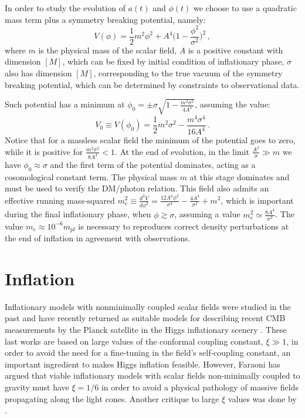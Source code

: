 \documentclass[preprintnumbers,amsmath,amssymb,nofootinbib]{revtex4}
\begin{document}
In order to study the evolution of $a(t)$ and $\phi(t)$ we choose to use a quadratic mass term plus a symmetry breaking potential, namely:
\begin{equation}
V(\phi)=\frac{1}{2}m^2\phi^2 + A^4\Bigg(1-\frac{\phi^2}{\sigma^2}\Bigg)^2 \,,\label{V}
\end{equation}
where $m$ is the physical mass of the scalar field, $A$ is a positive constant with dimension $[M]$, which can be fixed by initial condition of inflationary phase, $\sigma$ also has dimension $[M]$, corresponding to the true vacuum of the symmetry breaking potential, which can be determined by constraints to observational data.

Such potential has a minimum at $\phi_0 = \pm \sigma\sqrt{1-\frac{m^2\sigma^2}{4A^4}}$, assuming the value:
\begin{equation}
    V_0 \equiv V(\phi_0)=\frac{1}{2}m^2\sigma^2 - \frac{m^4 \sigma^4}{16 A^4}\,. \label{V0}
\end{equation}
Notice that for a massless scalar field the minimum of the potential goes to zero, while it is positive for $\frac{m^2\sigma^2}{8A^4}<1$. At the end of evolution, in the limit $\frac{A^2}{\sigma}\gg m$ we have $\phi_0\approx \sigma$ and the first term of the potential dominates, acting as a cosomological constant term. The physical mass $m$ at this stage dominates and must be used to verify the DM/photon relation. This field also admits an effective running mass-squared $m_e^2 \equiv \frac{d^2V}{d\phi^2} = \frac{12A^4\phi^2}{\sigma^4}-\frac{4A^4}{\sigma^2}+m^2$, which is important during the final inflationary phase, when $\phi\gtrsim \sigma$, assuming a value $m^2_{e}\simeq\frac{8A^4}{\sigma^2}$.
 The value $m_{e} \approx 10^{-6}m_{pl}$ is necessary to reproduces correct density perturbations at the end of inflation in agreement with observations.


\section{Inflation}

Inflationary models with nonminimally coupled scalar fields were studied in the past \cite{futamase89,accetta85,fakir90a,fakir90b,komatsu99} and have recently returned as suitable models for describing recent CMB measurements by the Planck satellite in the Higgs inflationary scenery \cite{bezrukov2008,martin2014,takahashi2020}. These last works are based on large values of the conformal coupling constant, $\xi \gg 1$, in order to avoid the need for a fine-tuning in the field's self-coupling constant, an important ingredient to makes Higgs inflation feasible. However, Faraoni \cite{faraoni2001} has argued  that viable inflationary models with scalar fields non-minimally coupled to gravity must have $\xi=1/6$ in order to avoid a physical pathology of massive fields propagating along the light cones. Another critique to large $\xi$ values was done by \cite{barbon2009}.
\end{document}
